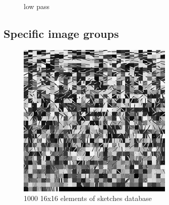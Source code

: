 \begin{figure}
\centering
{}
\hspace{5mm}
\caption{low pass}
\label{fig:16_1000_lasso}
\end{figure}



\subsection{Specific image groups}

\begin{figure}[h]
\centering
\includegraphics[width = 0.66\textwidth]{images/1000_sketches.png}
\caption{1000 16x16 elements of sketches database}
\label{fig:16_1000_lasso}
\end{figure}

